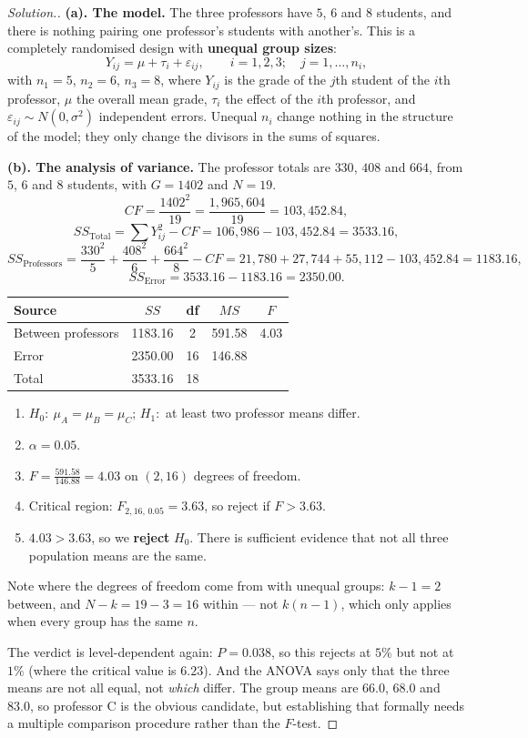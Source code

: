 \documentclass[11pt,a4paper]{article}
\theoremstyle{definition}
\newenvironment{solution}
  {\renewcommand{\qedsymbol}{}\begin{proof}[\textit{Solution}.]}
  {\end{proof}}
\begin{document}
\begin{solution}
\textbf{(a). The model.} The three professors have $5$, $6$ and $8$ students, and there is
nothing pairing one professor's students with another's. This is a completely randomised
design with \textbf{unequal group sizes}:
\[Y_{ij}=\mu+\tau_i+\varepsilon_{ij},\qquad i=1,2,3;\quad j=1,\ldots,n_i,\]
with $n_1=5$, $n_2=6$, $n_3=8$, where $Y_{ij}$ is the grade of the $j$th student of the
$i$th professor, $\mu$ the overall mean grade, $\tau_i$ the effect of the $i$th professor,
and $\varepsilon_{ij}\sim N(0,\sigma^2)$ independent errors. Unequal $n_i$ change nothing in
the structure of the model; they only change the divisors in the sums of squares.

\textbf{(b). The analysis of variance.} The professor totals are $330$, $408$ and $664$,
from $5$, $6$ and $8$ students, with $G=1402$ and $N=19$.
\[CF=\frac{1402^2}{19}=\frac{1{,}965{,}604}{19}=103{,}452.84,\]
\[SS_{\text{Total}}=\sum Y_{ij}^2-CF=106{,}986-103{,}452.84=3533.16,\]
\[SS_{\text{Professors}}=\frac{330^2}{5}+\frac{408^2}{6}+\frac{664^2}{8}-CF
=21{,}780+27{,}744+55{,}112-103{,}452.84=1183.16,\]
\[SS_{\text{Error}}=3533.16-1183.16=2350.00.\]
\begin{table}[H]
\centering
\begin{tabular}{lcccc}
Source & $SS$ & df & $MS$ & $F$\\
\hline
Between professors & 1183.16 & 2 & 591.58 & 4.03\\
Error & 2350.00 & 16 & 146.88 & \\
\hline
Total & 3533.16 & 18 & & \\
\end{tabular}
\end{table}
\begin{enumerate}
\item $H_0:\ \mu_A=\mu_B=\mu_C$; $H_1:$ at least two professor means differ.
\item $\alpha=0.05$.
\item $F=\frac{591.58}{146.88}=4.03$ on $(2,16)$ degrees of freedom.
\item Critical region: $F_{2,16,\,0.05}=3.63$, so reject if $F>3.63$.
\item $4.03>3.63$, so we \textbf{reject} $H_0$. There is sufficient evidence that not all
three population means are the same.
\end{enumerate}

Note where the degrees of freedom come from with unequal groups: $k-1=2$ between, and
$N-k=19-3=16$ within --- not $k(n-1)$, which only applies when every group has the same $n$.

The verdict is level-dependent again: $P=0.038$, so this rejects at $5\%$ but not at $1\%$
(where the critical value is $6.23$). And the ANOVA says only that the three means are not
all equal, not \emph{which} differ. The group means are $66.0$, $68.0$ and $83.0$, so
professor C is the obvious candidate, but establishing that formally needs a multiple
comparison procedure rather than the $F$-test.
\end{solution}
\end{document}
